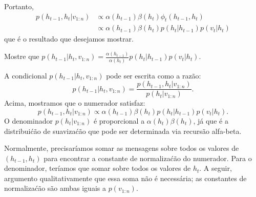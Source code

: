 \begin{exenumerate}
\begin{solution}
\begin{center}
{}
        \end{center}
        Portanto, 
        \begin{align}
            p(h_{t-1}, h_t| v_{1:n}) &\propto \alpha(h_{t-1}) \beta(h_t) \phi_t(h_{t-1}, h_t)\\
            &\propto \alpha(h_{t-1}) \beta(h_t) p(h_t|h_{t-1}) p(v_t|h_t)
        \end{align}
        que \'e o resultado que desejamos mostrar.
    \end{solution}
    
    
    \item Mostre que $p(h_{t-1}|h_t, v_{1:n}) = \frac{\alpha(h_{t-1})}{\alpha(h_t)} p(h_t|h_{t-1}) p(v_t|h_t)$.
    
    \begin{solution}
        A condicional $p(h_{t-1}|h_t, v_{1:n})$ pode ser escrita como a raz\~ao:
        \begin{equation}
            p(h_{t-1}|h_t, v_{1:n}) = \frac{p(h_{t-1}, h_t| v_{1:n})}{p(h_t|v_{1:n})}.
        \end{equation}
        Acima, mostramos que o numerador satisfaz:
        \begin{equation}
            p(h_{t-1}, h_t| v_{1:n}) \propto \alpha(h_{t-1}) \beta(h_t) p(h_t|h_{t-1}) p(v_t|h_t).
        \end{equation}
        O denominador $p(h_t|v_{1:n})$ \'e proporcional a $\alpha(h_t)
        \beta(h_t)$, j\'a que \'e a distribui\'c\~ao de suaviza\'c\~ao que pode ser
        determinada via recurs\~ao alfa-beta.
        
        Normalmente, precisar\'iamos somar as mensagens sobre todos os valores de
        $(h_{t-1},h_t)$ para encontrar a constante de normaliza\'c\~ao do
        numerador. Para o denominador, ter\'iamos que somar sobre todos os valores de
        $h_t$. A seguir, argumento qualitativamente que essa soma n\~ao
        \'e necess\'aria; as constantes de normaliza\'c\~ao s\~ao ambas iguais a
        $p(v_{1:n})$.
        

\end{solution}
\end{exenumerate}
